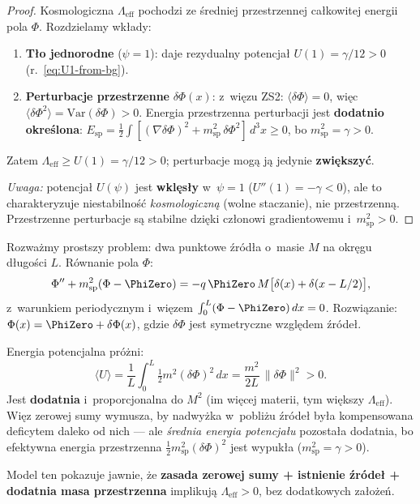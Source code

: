 \begin{proof}
Kosmologiczna $\Lambda_{\mathrm{eff}}$ pochodzi ze \'sredniej
przestrzennej ca\l{}kowitej energii pola $\Phi$. Rozdzielamy
wk\l{}ady:
\begin{enumerate}[nosep]
  \item \textbf{T\l{}o jednorodne} ($\psi = 1$): daje
    rezydualny potencja\l{} $U(1) = \gamma/12 > 0$
    (r.~\ref{eq:U1-from-bg}).
  \item \textbf{Perturbacje przestrzenne} $\delta\Phi(x)$:
    z~wi\k{e}zu ZS2: $\langle\delta\Phi\rangle = 0$,
    wi\k{e}c $\langle\delta\Phi^2\rangle = \mathrm{Var}(\delta\Phi) > 0$.
    Energia przestrzenna perturbacji jest \textbf{dodatnio
    okre\'slona}: $E_{\mathrm{sp}} = \frac{1}{2}\int
    [(\nabla\delta\Phi)^2 + m_{\mathrm{sp}}^2\,\delta\Phi^2]\,d^3x
    \geq 0$, bo $m_{\mathrm{sp}}^2 = \gamma > 0$.
\end{enumerate}
Zatem $\Lambda_{\mathrm{eff}} \geq U(1) = \gamma/12 > 0$;
perturbacje mog\k{a} j\k{a} jedynie \textbf{zwi\k{e}kszy\'c}.

\medskip\noindent
\emph{Uwaga:} potencja\l{} $U(\psi)$ jest \textbf{wkl\k{e}s\l{}y}
w~$\psi = 1$ ($U''(1) = -\gamma < 0$), ale to charakteryzuje
niestabilno\'s\'c \emph{kosmologiczn\k{a}} (wolne staczanie), nie
przestrzenn\k{a}. Przestrzenne perturbacje s\k{a} stabilne
dzi\k{e}ki cz\l{}onowi gradientowemu i~$m_{\mathrm{sp}}^2 > 0$.
\end{proof}

\begin{remark}\label{rem:toy-Lambda}
Rozwa\.zmy prostszy problem: dwa punktowe \'zr\'od\l{}a
o~masie $M$ na okr\k{e}gu d\l{}ugo\'sci $L$. R\'ownanie
pola $\Phi$:
\[
  \Phi'' + m_{\mathrm{sp}}^2(\Phi - \PhiZero)
  = -q\,\PhiZero\,M\bigl[\delta(x) + \delta(x - L/2)\bigr],
\]
z~warunkiem periodycznym i~wi\k{e}zem
$\int_0^L (\Phi - \PhiZero)\,dx = 0$.
Rozwi\k{a}zanie: $\Phi(x) = \PhiZero + \delta\Phi(x)$,
gdzie $\delta\Phi$ jest symetryczne wzgl\k{e}dem \'zr\'ode\l{}.

Energia potencjalna pr\'o\.zni:
\[
  \langle U \rangle
  = \frac{1}{L}\int_0^L \tfrac{1}{2}m^2(\delta\Phi)^2\,dx
  = \frac{m^2}{2L}\,\bigl\|\delta\Phi\bigr\|^2 > 0.
\]
Jest \textbf{dodatnia} i~proporcjonalna do $M^2$ (im wi\k{e}cej
materii, tym wi\k{e}kszy $\Lambda_{\mathrm{eff}}$).
Wi\k{e}z zerowej sumy wymusza, by nadwy\.zka w~pobli\.zu
\'zr\'ode\l{} by\l{}a kompensowana deficytem daleko od nich ---
ale \emph{\'srednia energia potencja\l{}u} pozosta\l{}a
dodatnia, bo efektywna energia przestrzenna
$\tfrac{1}{2}m_{\mathrm{sp}}^2(\delta\Phi)^2$ jest wypuk\l{}a
($m_{\mathrm{sp}}^2 = \gamma > 0$).

Model ten pokazuje jawnie, \.ze \textbf{zasada zerowej sumy +
istnienie \'zr\'ode\l{} + dodatnia masa przestrzenna} implikuj\k{a}
$\Lambda_{\mathrm{eff}} > 0$, bez dodatkowych za\l{}o\.ze\'n.
\end{remark}

